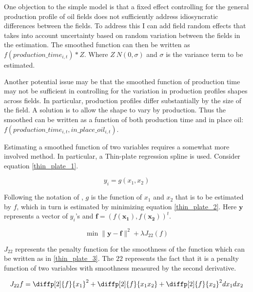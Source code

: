 \documentclass[11pt]{article}
\begin{document}
One objection to the simple model is that a fixed effect controlling for the general production profile of oil fields does not sufficiently address idiosyncratic differences between the fields. To address this I can add field random effects that takes into account uncertainty based on random variation between the fields in the estimation. The smoothed function can then be written as $f(production\_time_{i,t})*Z$.  Where $Z~N(0, \sigma)$ and $\sigma$ is the variance term to be estimated.  

Another potential issue may be that the smoothed function of production time may not be sufficient in controlling for the variation in production profiles shapes across fields.  In particular, production profiles differ substantially by the size of the field. A solution is to allow the shape to vary by production.  Thus the smoothed can be written as a function of both production time and in place oil: $f(production\_time_{i,t}, in\_place\_oil_{i,t})$.

Estimating a smoothed function of two variables requires a somewhat more involved method.  In particular, a Thin-plate regression spline \citep{wood_thin_2003} is used. Consider equation \ref{thin_plate_1}. 

	\begin{equation}
	y_i = g(x_1, x_2)
	\label{thin_plate_1}
	\end{equation}

Following the notation of \citet{wood_generalized_2006}, $g$ is the function of $x_1$ and $x_2$ that is to be estimated by $f$, which in turn is estimated by minimizing equation \ref{thin_plate_2}.  Here $\boldsymbol{y}$ represents a vector of $y_i$’s and $\boldsymbol{f} = (f(\boldsymbol{x_1}),f(\boldsymbol{x_2}))^t$.   

	\begin{equation}
\min \|\boldsymbol{y-f}\|^2 + \lambda J_{22}(f)
\label{thin_plate_2}
	\end{equation}

$J_{22}$ represents the penalty function for the smoothness of the function which can be written as in \ref{thin_plate_3}.  The $22$ represents the fact that it is a penalty function of two variables with smoothness measured by the second derivative.

	\begin{equation}
	J_{22}{f}= \diffp[2]{f}{x_1}^2 + \diffp[2]{f}{{x_1}{x_2}} + \diffp[2]{f}{x_2}^2dx_1 dx_2
\label{thin_plate_3}
	\end{equation}
\end{document}
